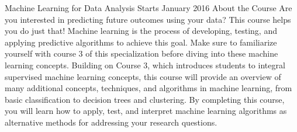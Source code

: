 Machine Learning for Data Analysis
Starts January 2016
About the Course
Are you interested in predicting future outcomes using your data? This course helps you do just that! Machine learning is the process of developing, testing, and applying predictive algorithms to achieve this goal. Make sure to familiarize yourself with course 3 of this specialization before diving into these machine learning concepts. Building on Course 3, which introduces students to integral supervised machine learning concepts, this course will provide an overview of many additional concepts, techniques, and algorithms in machine learning, from basic classification to decision trees and clustering. By completing this course, you will learn how to apply, test, and interpret machine learning algorithms as alternative methods for addressing your research questions.
